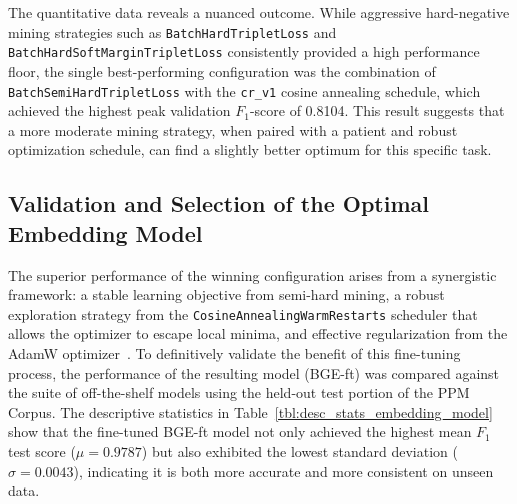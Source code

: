 The quantitative data reveals a nuanced outcome. While aggressive hard-negative mining strategies such as \verb|BatchHardTripletLoss| and \verb|BatchHardSoftMarginTripletLoss| consistently provided a high performance floor, the single best-performing configuration was the combination of \verb|BatchSemiHardTripletLoss| with the \verb|cr_v1| cosine annealing schedule, which achieved the highest peak validation \(F_1\)-score of 0.8104. This result suggests that a more moderate mining strategy, when paired with a patient and robust optimization schedule, can find a slightly better optimum for this specific task.

\subsection{Validation and Selection of the Optimal Embedding Model}\label{ch:4.4.3}
The superior performance of the winning configuration arises from a synergistic framework: a stable learning objective from semi-hard mining, a robust exploration strategy from the \verb|CosineAnnealingWarmRestarts| scheduler that allows the optimizer to escape local minima, and effective regularization from the AdamW optimizer~\cite{loshchilov2019decoupledweightdecayregularization, hermans2017defensetripletlossperson, Schroff_2015_CVPR, loshchilovhutter}. To definitively validate the benefit of this fine-tuning process, the performance of the resulting model (BGE-ft) was compared against the suite of off-the-shelf models using the held-out test portion of the PPM Corpus. The descriptive statistics in Table~\ref{tbl:desc_stats_embedding_model} show that the fine-tuned BGE-ft model not only achieved the highest mean \(F_1\) test score (\(\mu = 0.9787\)) but also exhibited the lowest standard deviation (\(\sigma = 0.0043\)), indicating it is both more accurate and more consistent on unseen data.

\begin{table}[h!]
    \captionsetup{skip=5pt}
\centering
\caption{Descriptive Statistics for F1-Scores by Embedding Model (Test Data)}
\label{tbl:desc_stats_embedding_model}
\end{table}


